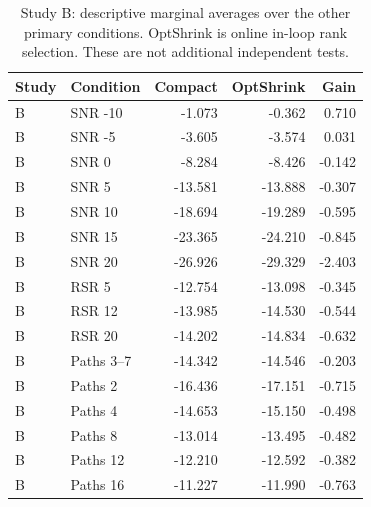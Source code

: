 \begin{table}[!t]
\caption{Study B: descriptive marginal averages over the other primary conditions. OptShrink is online in-loop rank selection. These are not additional independent tests.}
\label{tab:marginal-B}\centering\footnotesize
\setlength{\tabcolsep}{4pt}
\begin{tabular}{@{}llrrr@{}}\toprule
Study & Condition & Compact & OptShrink & Gain\\
\midrule
B & SNR -10 & -1.073 & -0.362 & 0.710\\
B & SNR -5 & -3.605 & -3.574 & 0.031\\
B & SNR 0 & -8.284 & -8.426 & -0.142\\
B & SNR 5 & -13.581 & -13.888 & -0.307\\
B & SNR 10 & -18.694 & -19.289 & -0.595\\
B & SNR 15 & -23.365 & -24.210 & -0.845\\
B & SNR 20 & -26.926 & -29.329 & -2.403\\
B & RSR 5 & -12.754 & -13.098 & -0.345\\
B & RSR 12 & -13.985 & -14.530 & -0.544\\
B & RSR 20 & -14.202 & -14.834 & -0.632\\
B & Paths 3--7 & -14.342 & -14.546 & -0.203\\
B & Paths 2 & -16.436 & -17.151 & -0.715\\
B & Paths 4 & -14.653 & -15.150 & -0.498\\
B & Paths 8 & -13.014 & -13.495 & -0.482\\
B & Paths 12 & -12.210 & -12.592 & -0.382\\
B & Paths 16 & -11.227 & -11.990 & -0.763\\
\bottomrule
\end{tabular}
\end{table}


